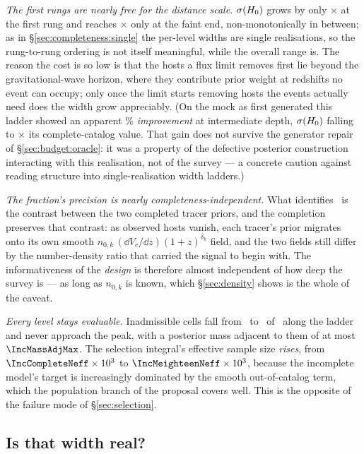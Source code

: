 \emph{The first rungs are nearly free for the distance scale.} $\sigma(H_0)$
grows by only \IncFacHzeroFirst$\times$ at the first rung and reaches
\IncFacHzeroMax$\times$ only at the faint end, non-monotonically in between;
as in \S\ref{sec:completeness:single} the per-level widths are single
realisations, so the rung-to-rung ordering is not itself meaningful, while
the overall range is. The reason the cost is so low is that the hosts a flux
limit removes first lie beyond the gravitational-wave horizon, where they
contribute prior weight at redshifts no event can occupy; only once the limit
starts removing hosts the events actually need does the width grow
appreciably. (On the mock as first generated this ladder showed an apparent
\IncPreFacHzeroGain\% \emph{improvement} at intermediate depth,
$\sigma(H_0)$ falling to \IncPreFacHzeroMin$\times$ its complete-catalog
value. That gain does not survive the generator repair of
\S\ref{sec:budget:oracle}: it was a property of the defective posterior
construction interacting with this realisation, not of the survey --- a
concrete caution against reading structure into single-realisation width
ladders.)

\emph{The fraction's precision is nearly completeness-independent.} What
identifies \fagn\ is the contrast between the two completed tracer priors, and
the completion preserves that contrast: as observed hosts vanish, each tracer's
prior migrates onto its own smooth $n_{0,k}\,(\dd V_c/\dd z)(1+z)^{\delta_k}$
field, and the two fields still differ by the number-density ratio that carried
the signal to begin with. The informativeness of the \emph{design} is therefore
almost independent of how deep the survey is --- as long as $n_{0,k}$ is known,
which \S\ref{sec:density} shows is the whole of the caveat.

\emph{Every level stays evaluable.} Inadmissible cells fall from \IncRejMax\ to
\IncRejMin\ of \IncCompleteCells\ along the ladder and never approach the peak,
with a posterior mass adjacent to them of at most $\IncMassAdjMax$. The
selection integral's effective sample size \emph{rises}, from
$\IncCompleteNeff \times 10^3$ to $\IncMeighteenNeff \times 10^3$, because the
incomplete model's target is increasingly dominated by the smooth
out-of-catalog term, which the population branch of the proposal covers well.
This is the opposite of the failure mode of \S\ref{sec:selection}.

\subsection{Is that width real?}
\label{sec:completeness:null}

